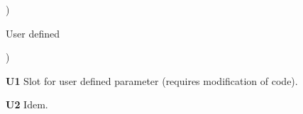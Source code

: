 \begin{list}{)\hfill}
\item{User defined }

\begin{list}{)\hfill}
            { \leftmargin 8mm 
             \rightmargin 0mm \itemsep 0mm \parsep 0mm}

\item \textbf{U1} Slot for user defined parameter (requires modification of code).
\item \textbf{U2} Idem.
\end{list}

\end{list}





